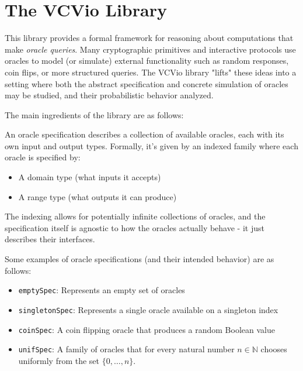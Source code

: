 \section{The VCVio Library}\label{sec:vcvio}

This library provides a formal framework for reasoning about computations that make \emph{oracle
queries}. Many cryptographic primitives and interactive protocols use oracles to model (or simulate)
external functionality such as random responses, coin flips, or more structured queries. The VCVio
library "lifts" these ideas into a setting where both the abstract specification and concrete
simulation of oracles may be studied, and their probabilistic behavior analyzed.

The main ingredients of the library are as follows:

\begin{definition}
    \label{def:oracle_spec}
    An oracle specification describes a collection of available oracles, each with its own input and output types. 
    Formally, it's given by an indexed family where each oracle is specified by:
    \begin{itemize}
        \item A domain type (what inputs it accepts)
        \item A range type (what outputs it can produce)
    \end{itemize}
    The indexing allows for potentially infinite collections of oracles, and the specification itself 
    is agnostic to how the oracles actually behave - it just describes their interfaces.
\end{definition}

Some examples of oracle specifications (and their intended behavior) are as follows:
\begin{itemize}
    \item \verb|emptySpec|: Represents an empty set of oracles
    \item \verb|singletonSpec|: Represents a single oracle available on a singleton index
    \item \verb|coinSpec|: A coin flipping oracle that produces a random Boolean value
    \item \verb|unifSpec|: A family of oracles that for every natural number $n \in \mathbb{N}$ chooses uniformly from the set $\{0, \ldots, n\}$.
\end{itemize}

